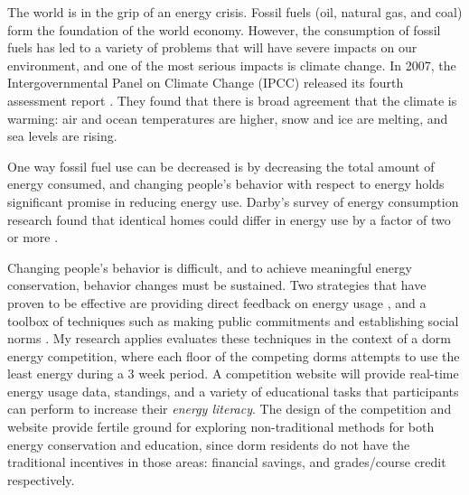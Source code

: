 \documentclass{chi-ext}
\begin{document}
\begin{multicols}{2}

The world is in the grip of an energy crisis. Fossil fuels (oil, natural gas, and coal) form the foundation of the world economy. However, the consumption of fossil fuels has led to a variety of problems that will have severe impacts on our environment, and one of the most serious impacts is climate change. In 2007, the Intergovernmental Panel on Climate Change (IPCC) released its fourth assessment report \cite{IPCC-synthesis-report-2007}. They found that there is broad agreement that the climate is warming: air and ocean temperatures are higher, snow and ice are melting, and sea levels are rising.

One way fossil fuel use can be decreased is by decreasing the total amount of energy consumed, and changing people's behavior with respect to energy holds significant promise in reducing energy use. Darby's survey of energy consumption research found that identical homes could differ in energy use by a factor of two or more \cite{darby-review-2006}.

Changing people's behavior is difficult, and to achieve meaningful energy conservation, behavior changes must be sustained. Two strategies that have proven to be effective are providing direct feedback on energy usage \cite{darby-review-2006}, and a toolbox of techniques such as making public commitments and establishing social norms \cite{McKenzie-Mohr2009}. My research applies evaluates these techniques in the context of a dorm energy competition, where each floor of the competing dorms attempts to use the least energy during a 3 week period. A competition website will provide real-time energy usage data, standings, and a variety of educational tasks that participants can perform to increase their \emph{energy literacy}. The design of the competition and website provide fertile ground for exploring non-traditional methods for both energy conservation and education, since dorm residents do not have the traditional incentives in those areas: financial savings, and grades/course credit respectively.


\end{multicols}
\end{document}
